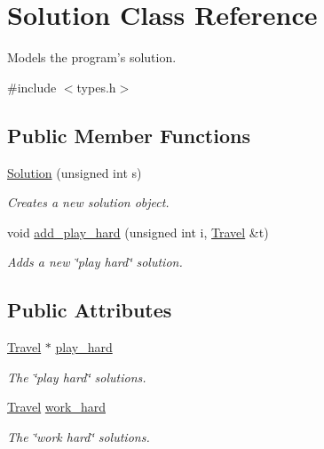 \hypertarget{class_solution}{\section{Solution Class Reference}
\label{class_solution}
}


Models the program's solution.  




{\ttfamily \#include $<$types.\-h$>$}

\subsection*{Public Member Functions}
\begin{DoxyCompactItemize}
\item 
\hyperlink{class_solution_ae355b59b0c5da290ec0be4b23fa709bd}{Solution} (unsigned int s)
\begin{DoxyCompactList}\small\item\em Creates a new solution object. \end{DoxyCompactList}\item 
void \hyperlink{class_solution_a1d10fedbb1083da04f5c72c17a25b914}{add\-\_\-play\-\_\-hard} (unsigned int i, \hyperlink{class_travel}{Travel} \&t)
\begin{DoxyCompactList}\small\item\em Adds a new \char`\"{}play hard\char`\"{} solution. \end{DoxyCompactList}\end{DoxyCompactItemize}
\subsection*{Public Attributes}
\begin{DoxyCompactItemize}
\item 
\hyperlink{class_travel}{Travel} $\ast$ \hyperlink{class_solution_a44f701ebb75bb81bdbce55e3b993a8ed}{play\-\_\-hard}
\begin{DoxyCompactList}\small\item\em The \char`\"{}play hard\char`\"{} solutions. \end{DoxyCompactList}\item 
\hyperlink{class_travel}{Travel} \hyperlink{class_solution_aa01e223ab1abc7d44183834d542ecc6b}{work\-\_\-hard}
\begin{DoxyCompactList}\small\item\em The \char`\"{}work hard\char`\"{} solutions. \end{DoxyCompactList}\end{DoxyCompactItemize}



